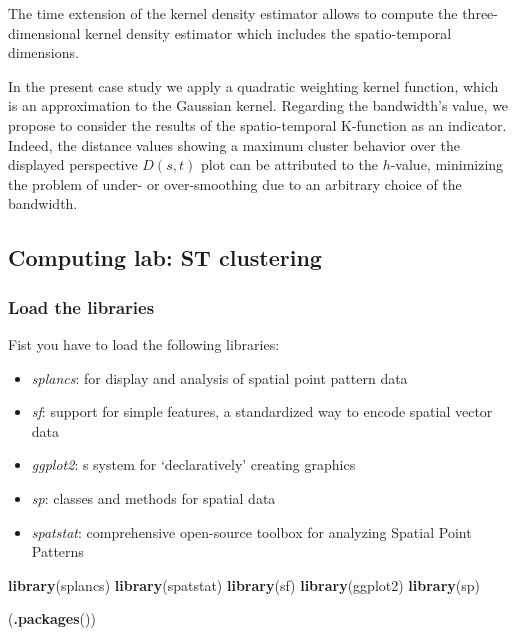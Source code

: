 \documentclass[
]{article}
\newenvironment{Shaded}{\begin{snugshade}}{\end{snugshade}}
\newcommand{\FunctionTok}[1]{\textcolor[rgb]{0.13,0.29,0.53}{\textbf{#1}}}
\newcommand{\NormalTok}[1]{#1}
\providecommand{\tightlist}{%
  \setlength{\itemsep}{0pt}\setlength{\parskip}{0pt}}
\begin{document}
The time extension of the kernel density estimator allows to compute the three-dimensional kernel density estimator which includes the spatio-temporal dimensions\citep{nakaya_visualising_2010}.

In the present case study we apply a quadratic weighting kernel function, which is an approximation to the Gaussian kernel.
Regarding the bandwidth's value, we propose to consider the results of the spatio-temporal K-function as an indicator.
Indeed, the distance values showing a maximum cluster behavior over the displayed perspective \(D(s,t)\) plot can be attributed to the \(h\)-value, minimizing the problem of under- or over-smoothing due to an arbitrary choice of the bandwidth.

\subsection{Computing lab: ST clustering}\label{computing-lab-st-clustering}

\subsubsection{Load the libraries}\label{load-the-libraries-1}

Fist you have to load the following libraries:

\begin{itemize}
\tightlist
\item
  \emph{splancs}: for display and analysis of spatial point pattern data
\item
  \emph{sf}: support for simple features, a standardized way to encode spatial vector data
\item
  \emph{ggplot2}: s system for `declaratively' creating graphics
\item
  \emph{sp}: classes and methods for spatial data
\item
  \emph{spatstat}: comprehensive open-source toolbox for analyzing Spatial Point Patterns
\end{itemize}

\begin{Shaded}
\begin{Highlighting}[]
\FunctionTok{library}\NormalTok{(splancs)}
\FunctionTok{library}\NormalTok{(spatstat)}
\FunctionTok{library}\NormalTok{(sf)}
\FunctionTok{library}\NormalTok{(ggplot2)}
\FunctionTok{library}\NormalTok{(sp)}

\NormalTok{(}\FunctionTok{.packages}\NormalTok{())}
\end{Highlighting}
\end{Shaded}
\end{document}
